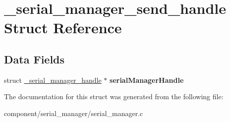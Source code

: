 \hypertarget{struct__serial__manager__send__handle}{}\section{\+\_\+serial\+\_\+manager\+\_\+send\+\_\+handle Struct Reference}
\label{struct__serial__manager__send__handle}
\subsection*{Data Fields}
\begin{DoxyCompactItemize}
\item 
\mbox{\label{struct__serial__manager__send__handle_a505adda4a9902514f8c6b0b2f1495e33}} 
struct \mbox{\hyperlink{struct__serial__manager__handle}{\+\_\+serial\+\_\+manager\+\_\+handle}} $\ast$ {\bfseries serial\+Manager\+Handle}
\end{DoxyCompactItemize}


The documentation for this struct was generated from the following file\+:\begin{DoxyCompactItemize}
\item 
component/serial\+\_\+manager/serial\+\_\+manager.\+c\end{DoxyCompactItemize}
